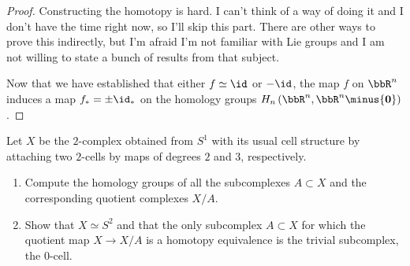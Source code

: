 \begin{proof}
Constructing the homotopy is hard. I can't think of a way of doing it and I
don't have the time right now, so I'll skip this part. There are other ways
to prove this indirectly, but I'm afraid I'm not familiar with Lie groups
and I am not willing to state a bunch of results from that subject.

Now that we have established that either $f\simeq \id$ or $-\id$, the map
$f$ on $\bbR^n$ induces a map $f_*=\pm\id_*$ on the homology groups
$H_n\left(\bbR^n,\bbR^n\minus\{\mathbf{0}\}\right)$.
\end{proof}
\newpage

\begin{problem}[Hatcher {\S}2.2, Ex.\@ 13]
Let $X$ be the $2$-complex obtained from $S^1$ with its usual cell
structure by attaching two $2$-cells by maps of degrees $2$ and $3$,
respectively.
\begin{enumerate}[label=(\alph*)]
\item Compute the homology groups of all the subcomplexes $A\subset X$ and
  the corresponding quotient complexes $X/A$.
\item Show that $X\simeq S^2$ and that the only subcomplex $A\subset X$ for
  which the quotient map $X\to X/A$ is a homotopy equivalence is the
  trivial subcomplex, the $0$-cell.
\end{enumerate}
\end{problem}
